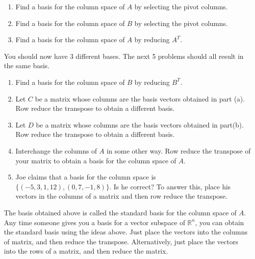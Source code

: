 \begin{enumerate}
\begin{enumerate}
	\item \label{project2A} Find a basis for the column space of $A$ by selecting the pivot columns.
	\item \label{project2B} Find a basis for the column space of $B$ by selecting the pivot columns.
	\item Find a basis for the column space of $A$ by reducing $A^T$. 
	\end{enumerate}
	
	You should now have 3 different bases. The next 5 problems should all result in the same basis.
	\begin{enumerate}[resume]
	\item Find a basis for the column space of $B$ by reducing $B^T$.
	\item Let $C$ be a matrix whose columns are the basis vectors obtained in part (a). Row reduce the transpose to obtain a different basis. 
	\item Let $D$ be a matrix whose columns are the basis vectors obtained in part(b). Row reduce the transpose to obtain a different basis.
	\item Interchange the columns of $A$ in some other way.  Row reduce the transpose of your matrix to obtain a basis for the column space of $A$.
	\item Joe claims that a basis for the column space is 
	$\{(-5,3,1,12),(0,7,-1,8)\}$.  Is he correct?  To answer this, place his vectors in the columns of a matrix and then row reduce the transpose.  
\end{enumerate}

The basis obtained above is called the standard basis for the column space of $A$. Any time someone gives you a basis for a vector subspace of $\mathbb{R}^n$, you can obtain the standard basis using the ideas above.  Just place the  vectors into the columns of matrix, and then reduce the transpose. Alternatively, just place the vectors into the rows of a matrix, and then reduce the matrix. 




 



\end{enumerate}


